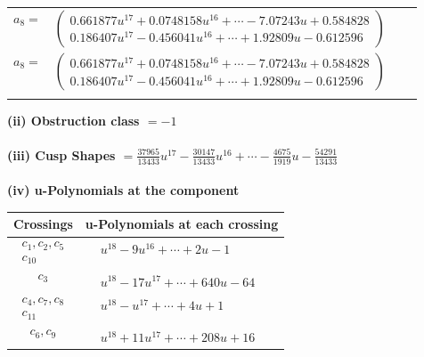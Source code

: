 \documentclass[1p]{elsarticle_modified}
\theoremstyle{definition}
\begin{document}
\begin{tabular}{m{7pt} m{180pt} m{7pt} m{180pt} }
\flushright $a_{8}=$&$\begin{pmatrix}0.661877 u^{17}+0.0748158 u^{16}+\cdots-7.07243 u+0.584828\\0.186407 u^{17}-0.456041 u^{16}+\cdots+1.92809 u-0.612596\end{pmatrix}$\\ \flushright $a_{8}=$&$\begin{pmatrix}0.661877 u^{17}+0.0748158 u^{16}+\cdots-7.07243 u+0.584828\\0.186407 u^{17}-0.456041 u^{16}+\cdots+1.92809 u-0.612596\end{pmatrix}$\\&\end{tabular}
\flushleft \textbf{(ii) Obstruction class $= -1$}\\~\\
\flushleft \textbf{(iii) Cusp Shapes $= \frac{37965}{13433} u^{17}-\frac{30147}{13433} u^{16}+\cdots-\frac{4675}{1919} u-\frac{54291}{13433}$}\\~\\
\newpage\renewcommand{\arraystretch}{1}
\flushleft \textbf{(iv) u-Polynomials at the component}\newline \\
\begin{tabular}{m{50pt}|m{274pt}}
Crossings & \hspace{64pt}u-Polynomials at each crossing \\
\hline $$\begin{aligned}c_{1},c_{2},c_{5}\\c_{10}\end{aligned}$$&$\begin{aligned}
&u^{18}-9 u^{16}+\cdots+2 u-1
\end{aligned}$\\
\hline $$\begin{aligned}c_{3}\end{aligned}$$&$\begin{aligned}
&u^{18}-17 u^{17}+\cdots+640 u-64
\end{aligned}$\\
\hline $$\begin{aligned}c_{4},c_{7},c_{8}\\c_{11}\end{aligned}$$&$\begin{aligned}
&u^{18}- u^{17}+\cdots+4 u+1
\end{aligned}$\\
\hline $$\begin{aligned}c_{6},c_{9}\end{aligned}$$&$\begin{aligned}
&u^{18}+11 u^{17}+\cdots+208 u+16
\end{aligned}$\\
\hline
\end{tabular}\\~\\
\end{document}
